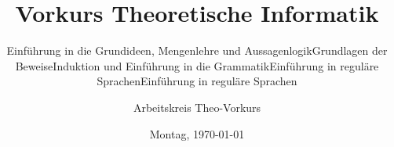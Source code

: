%
%
%
%

\title{Vorkurs Theoretische Informatik}

\if{}
    \subtitle{Einführung in die Grundideen, Mengenlehre und Aussagenlogik}
    \newcommand\daynamestr{Montag}
\fi
\if{}
    \subtitle{Grundlagen der Beweise}
    \newcommand\daynamestr{Dienstag}
    \AdvanceDate
\fi
\if{}
    \subtitle{Induktion und Einführung in die Grammatik}
    \newcommand\daynamestr{Mittwoch}
    \AdvanceDate\AdvanceDate
\fi
\if{}
    \subtitle{Einführung in reguläre Sprachen}
    \newcommand\daynamestr{Donnerstag}
    \AdvanceDate\AdvanceDate\AdvanceDate
\fi
\if{}
    \subtitle{Einführung in reguläre Sprachen}
    \newcommand\daynamestr{Freitag}
    \AdvanceDate\AdvanceDate\AdvanceDate
\fi


\date{\daynamestr, \today}

\author{Arbeitskreis Theo-Vorkurs}
